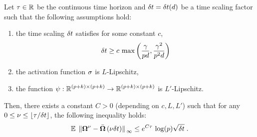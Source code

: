 \documentclass[10pt]{article}
\begin{document}
\begin{theorem}  \label{th:conv_eps} Let $\tau \in \operatorname{\mathbb{R}} $ be the continuous time horizon and $ \delta t  = \delta t (d)$ be a time scaling factor such that the following assumptions hold:
\begin{enumerate}
     \item \label{ass_main:2} the time scaling $\delta t$ satisfies for some constant $c$,
        \begin{equation}\label{eq:lower_bound_deltat}
        \delta t \geq c\, \max\left( \frac{\gamma}{p d}, \frac{\gamma^2}{p^2 d}  \right)
        \end{equation}
    \item \label{ass_main:1} the activation function $\sigma$ is $L$-Lipschitz,
    \item \label{ass_main:3} the function $\psi : \operatorname{\mathbb{R}}^{(p+k)\times(p+k)} \rightarrow \operatorname{\mathbb{R}}^{(p+k)\times(p+k)}$ is $L'$-Lipschitz.
\end{enumerate}
Then, there exists a constant $C > 0$ (depending on $c, L, L'$) such that for any  $0 \leq \nu \leq  \lfloor \tau / \delta t \rfloor $, the following inequality holds:
\begin{equation}
\label{eq:conv_bound}
\operatorname{\mathbb{E}}\;\norm*{\bm{\Omega}^\nu -\bar{\bm{\Omega}} \left( \nu \delta t \right)  }_\infty \le e^{C\tau} \, \log (p) \sqrt{\delta t} \;.
\end{equation}
\end{theorem}
\end{document}

